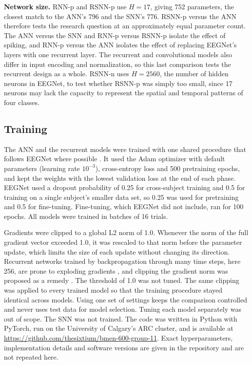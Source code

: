 \documentclass[conference]{IEEEtran}
\begin{document}
\textbf{Network size.} RNN-p and RSNN-p use $H = 17$, giving 752 parameters, the closest match to the ANN's 796 and the SNN's 776. RSNN-p versus the ANN therefore tests the research question at an approximately equal parameter count. The ANN versus the SNN and RNN-p versus RSNN-p isolate the effect of spiking, and RNN-p versus the ANN isolates the effect of replacing EEGNet's layers with one recurrent layer. The recurrent and convolutional models also differ in input encoding and normalization, so this last comparison tests the recurrent design as a whole. RSNN-n uses $H = 2560$, the number of hidden neurons in EEGNet, to test whether RSNN-p was simply too small, since 17 neurons may lack the capacity to represent the spatial and temporal patterns of four classes.

\subsection{Training}
\label{sec:training}

The ANN and the recurrent models were trained with one shared procedure that follows EEGNet where possible \cite{lawhern2018}. It used the Adam optimizer with default parameters (learning rate $10^{-3}$), cross-entropy loss and 500 pretraining epochs, and kept the weights with the lowest validation loss at the end of each phase. EEGNet used a dropout probability of 0.25 for cross-subject training and 0.5 for training on a single subject's smaller data set, so 0.25 was used for pretraining and 0.5 for fine-tuning. Fine-tuning, which EEGNet did not include, ran for 100 epochs. All models were trained in batches of 16 trials.

Gradients were clipped to a global L2 norm of 1.0. Whenever the norm of the full gradient vector exceeded 1.0, it was rescaled to that norm before the parameter update, which limits the size of each update without changing its direction. Recurrent networks trained by backpropagation through many time steps, here 256, are prone to exploding gradients \cite{bengio1994,pascanu2013}, and clipping the gradient norm was proposed as a remedy \cite{pascanu2013}. The threshold of 1.0 was not tuned. The same clipping was applied to every trained model so that the training procedure stayed identical across models. Using one set of settings keeps the comparison controlled and never uses test data for model selection. Tuning each model separately was out of scope. The SNN was not trained. The code was written in Python with PyTorch, run on the University of Calgary's ARC cluster, and is available at \url{https://github.com/thesixtium/bmen-600-group-11}. Exact hyperparameters, implementation details and software versions are given in the repository and are not repeated here.
\end{document}
